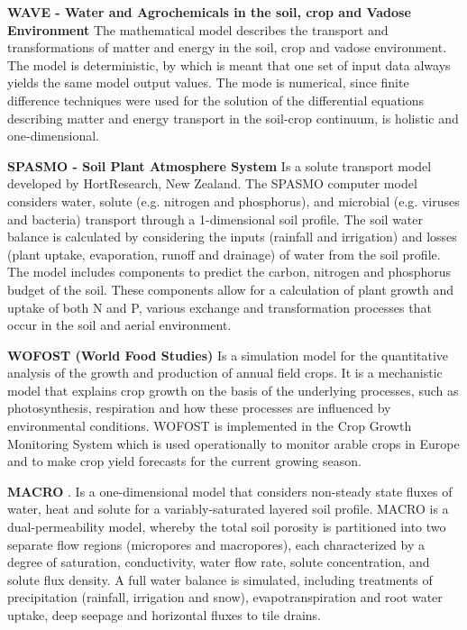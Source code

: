 \documentclass[letterpaper, 10 pt, conference]{ieeeconf}  %
\begin{document}
\textbf{WAVE - Water and Agrochemicals in the soil, crop and Vadose Environment} \cite{vanclooster1994wave} The mathematical model describes the transport and transformations of matter and energy in the soil, crop and vadose environment.  The model is deterministic, by which is meant that one set of input data always yields the same model output values. The mode is numerical, since finite difference techniques were used for the solution of the differential equations describing matter and energy transport in the soil-crop continuum, is holistic and one-dimensional. 

\textbf{SPASMO - Soil Plant Atmosphere System} \cite{green2002pesticide} Is a solute transport model developed by HortResearch, New Zealand. The SPASMO computer model considers water, solute (e.g. nitrogen and phosphorus), and microbial (e.g. viruses and bacteria) transport through a 1-dimensional soil profile. The soil water balance is calculated by considering the inputs (rainfall and irrigation) and losses (plant uptake, evaporation, runoff and drainage) of water from the soil profile. The model includes components to predict the carbon, nitrogen and phosphorus budget of the soil. These components allow for a calculation of plant growth and uptake of both N and P, various exchange and transformation processes that occur in the soil and aerial environment.

\textbf{WOFOST (World Food Studies)} \cite{diepen1989wofost}
 Is a simulation model for the quantitative analysis of the growth and production of annual field crops. It is a mechanistic model that explains crop growth on the basis of the underlying processes, such as photosynthesis, respiration and how these processes are influenced by environmental conditions. WOFOST is implemented in the Crop Growth Monitoring System which is used operationally to monitor arable crops in Europe and to make crop yield forecasts for the current growing season.

\textbf{MACRO} \cite{larsbo2003macro}. Is a one-dimensional model that considers non-steady state fluxes of water, heat and solute for a variably-saturated layered soil profile. MACRO is a dual-permeability model, whereby the total soil porosity is partitioned into two separate flow regions (micropores and macropores), each characterized by a degree of saturation, conductivity, water flow rate, solute concentration, and solute flux density. A full water  balance is simulated, including treatments of precipitation (rainfall, irrigation and snow), evapotranspiration and root water uptake, deep seepage and horizontal fluxes to tile drains. 
\end{document}
